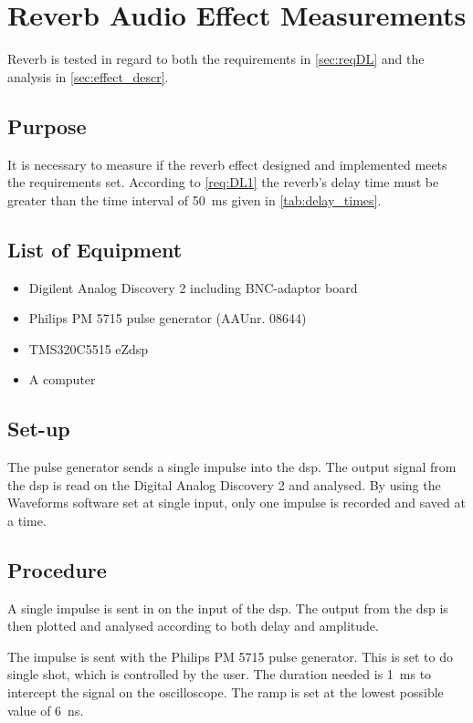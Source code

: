 \chapter{Reverb Audio Effect Measurements}\label{reverb_meas_app} 
Reverb is tested in regard to both the requirements in \autoref{sec:reqDL} and the analysis in \autoref{sec:effect_descr}.


\section{Purpose}
It is necessary to measure if the reverb effect designed and implemented meets the requirements set. According to \autoref{req:DL1} the reverb's delay time must be greater than the time interval of \SI{50}{\milli\second} given in \autoref{tab:delay_times}.  

\section{List of Equipment}
\begin{itemize}
	\item Digilent Analog Discovery 2 including BNC-adaptor board
	\item Philips PM 5715 pulse generator (AAUnr. 08644)
	\item TMS320C5515 eZdsp
	\item A computer
\end{itemize}

\section{Set-up}
The pulse generator sends a single impulse into the \gls{dsp}. The output signal from the \gls{dsp} is read on the Digital Analog Discovery 2 and analysed. By using the Waveforms software set at single input, only one impulse is recorded and saved at a time.

\section{Procedure}
A single impulse is sent in on the input of the \gls{dsp}. The output from the \gls{dsp} is then plotted and analysed according to both delay and amplitude.

The impulse is sent with the Philips PM 5715 pulse generator. This is set to do single shot, which is controlled by the user. The duration needed is \SI{1}{\milli\second} to intercept the signal on the oscilloscope. The ramp is set at the lowest possible value of \SI{6}{\nano\second}.

